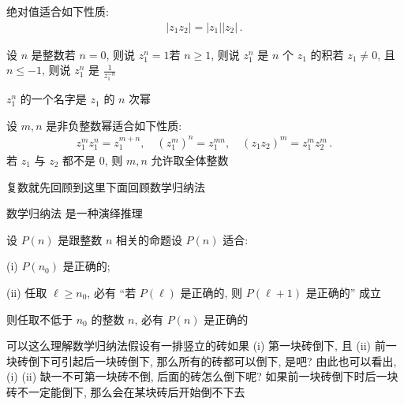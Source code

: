 \begin{proposition}
    绝对值适合如下性质:
    \begin{align*}
        |z_1 z_2| = |z_1| |z_2| \period
    \end{align*}
\end{proposition}

\begin{definition}
    设 $n$ 是整数\period 若 $n=0$, 则说 $z_1^n = 1$\period 若 $n \geq 1$, 则说 $z_1^n$ 是 $n$ 个 $z_1$ 的积\period 若 $z_1 \neq 0$, 且 $n \leq -1$, 则说 $z_1^n$ 是 $\frac{1}{z_1^{-n}}$\period

    $z_1^n$ 的一个名字是 $z_1$ 的 $n$ 次幂 \period
\end{definition}

\begin{proposition}
    设 $m,n$ 是非负整数\period 幂适合如下性质:
    \begin{align*}
        z_1^m z_1^n = z_1^{m+n}, \quad (z_1^m)^n = z_1^{mn}, \quad (z_1 z_2)^m = z_1^m z_2^m \period
    \end{align*}
    若 $z_1$ 与 $z_2$ 都不是 $0$, 则 $m,n$ 允许取全体整数\period
\end{proposition}

复数就先回顾到这里\period 下面回顾数学归纳法\period

\begin{remark}
    数学归纳法  是一种演绎推理\period
\end{remark}

\begin{proposition}
    设 $P(n)$ 是跟整数 $n$ 相关的命题\period 设 $P(n)$ 适合:

    (i) $P(n_0)$ 是正确的;

    (ii) 任取 $\ell \geq n_0$, 必有 ``若 $P(\ell)$ 是正确的, 则 $P(\ell + 1)$ 是正确的'' 成立\period

    则任取不低于 $n_0$ 的整数 $n$, 必有 $P(n)$ 是正确的\period
\end{proposition}

\begin{remark}
    可以这么理解数学归纳法\period 假设有一排竖立的砖\period 如果 (i) 第一块砖倒下, 且 (ii) 前一块砖倒下可引起后一块砖倒下, 那么所有的砖都可以倒下, 是吧? 由此也可以看出, (i) (ii) 缺一不可\period 第一块砖不倒, 后面的砖怎么倒下呢? 如果前一块砖倒下时后一块砖不一定能倒下, 那么会在某块砖后开始倒不下去\period
\end{remark}

